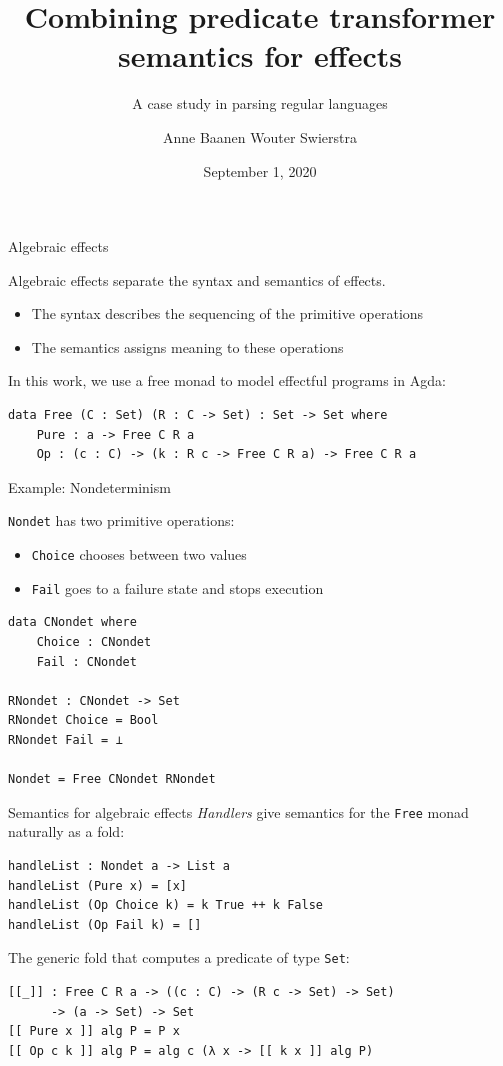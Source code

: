 \documentclass[ignorenonframetext,]{beamer}
\title[Combining predicate transformer semantics]{Combining predicate transformer semantics for effects}
\subtitle{A case study in parsing regular languages}
\author{Anne Baanen \hspace{5.1em} Wouter Swierstra}
\institute{Vrije Universiteit Amsterdam \hspace{1em} Utrecht University}
\date{September 1, 2020}
\date{}
\newcommand{\Agda}[1]{\texttt{#1}\xspace}
\newcommand{\Free}{\Agda{Free}}
\newcommand{\Set}{\Agda{Set}}
\begin{document}
\frame{\titlepage}

\begin{frame}[fragile]{Algebraic effects}

Algebraic effects separate the syntax and semantics of effects.

\begin{itemize}
	\item The syntax describes the sequencing of the primitive operations
	\item The semantics assigns meaning to these operations
\end{itemize}

In this work, we use a free monad to model effectful programs in Agda:

\begin{verbatim}
data Free (C : Set) (R : C -> Set) : Set -> Set where
    Pure : a -> Free C R a
    Op : (c : C) -> (k : R c -> Free C R a) -> Free C R a
\end{verbatim}
\end{frame}

\begin{frame}[fragile]{Example: Nondeterminism}

\Agda{Nondet} has two primitive operations:
\begin{itemize}
    \item \Agda{Choice} chooses between two values
    \item \Agda{Fail} goes to a failure state and stops execution
\end{itemize}
\begin{verbatim}
data CNondet where
	Choice : CNondet
	Fail : CNondet

RNondet : CNondet -> Set
RNondet Choice = Bool
RNondet Fail = ⊥

Nondet = Free CNondet RNondet
\end{verbatim}
\end{frame}

\begin{frame}[fragile]{Semantics for algebraic effects}
\emph{Handlers} give semantics for the \Free monad naturally as a fold:
\begin{verbatim}
handleList : Nondet a -> List a
handleList (Pure x) = [x]
handleList (Op Choice k) = k True ++ k False
handleList (Op Fail k) = []
\end{verbatim}

\pause
The generic fold that computes a predicate of type \Set:
\begin{verbatim}
[[_]] : Free C R a -> ((c : C) -> (R c -> Set) -> Set)
      -> (a -> Set) -> Set
[[ Pure x ]] alg P = P x
[[ Op c k ]] alg P = alg c (λ x -> [[ k x ]] alg P)
\end{verbatim}
\end{frame}
\end{document}
